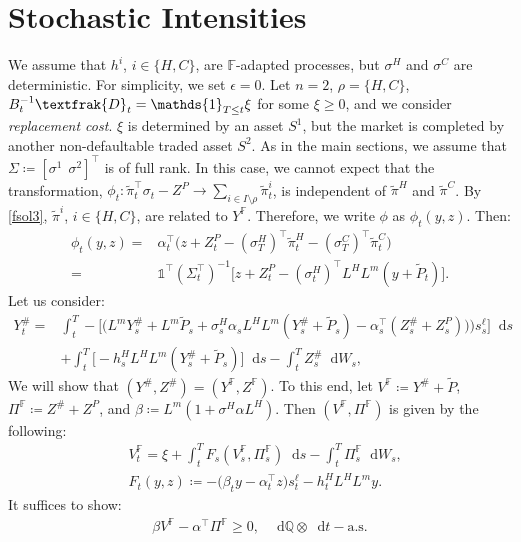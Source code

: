 \documentclass[a4paper, 11pt]{article}              %
\numberwithin{equation}{section}
\theoremstyle{plain}
\newcommand{\dqdt}{\df \dsQ \otimes \df t-\text{a.s}}
\newcommand{\1}{\mathds{1}}
\newcommand{\frD}{\textfrak{D}}
\newcommand{\pt}{\tilde{P}}
\newcommand{\pit}{\tilde{\pi}}
\newcommand{\dsF}{\mathbb{F}}
\newcommand{\dsQ}{\mathbb{Q}}
\theoremstyle{plain}
\theoremstyle{definition}
\theoremstyle{plain}
\newcommand*\df{\mathop{}\!\mathrm{d}}
\begin{document}
\section{Stochastic Intensities}
\label{app:sto.int}
We assume that $h^i$, $i \in \{H, C\}$, are $\dsF$-adapted processes, but
$\sigma^H$ and $\sigma^C$ are deterministic. For simplicity, we set
$\epsilon = 0$. Let $n=2$, $\rho =\{H, C\}$, $B_t^{-1}\frD_t = \1_{T \leq t}\xi$ for some
$\xi\geq0$, and we consider \textit{replacement cost}. $\xi$ is determined by an
asset $S^1$, but the market is completed by another non-defaultable traded asset
$S^2$. As in the main sections, we assume that
 $ \Sigma \coloneqq [\sigma^1 ~~\sigma^2]^\top $
is of full rank.  In this case, we cannot expect that the transformation,
 $\phi_t   \colon  \pit_t^\top\sigma_t-Z^P \to  \sum_{i \in I\setminus \rho} \pit^i_t$,
is independent of $\pit^H$ and $\pit^C$. By \cref{fsol3},
$\pit^i$, $i \in \{H, C\}$, are related to  $Y^\dsF$. Therefore, we write $\phi$ as
$  \phi_t(y, z)$. 
 Then:
\begin{align}
  \phi_t(y, z)
  =& \alpha_t^\top\big(z+Z^P_t-(\sigma^H_T)^\top\pit^H_t-(\sigma^C_T)^\top\pit^C_t\big)\nonumber \\
  =& \1^\top(\Sigma^\top_t)^{-1}\big[z+Z^P_t-(\sigma^H_t)^\top L^HL^m(y + \pt_t)\big].\nonumber
\end{align}
Let us consider:
\begin{align}
  Y^\#_t =& \int_{t}^{T} -\bigg[\Big(L^mY^\#_s +L^m\pt_s
            +\sigma^H_s\alpha_s L^HL^m(Y^\#_s+\pt_s)-\alpha_s^\top(Z^\#_s+Z^P_s))\Big)s^{\ell}_s
            \bigg]\df s\nonumber\\
  &+\int_{t}^{T}
    \big[-h^H_sL^HL^m(Y^\#_s+\pt_s)\big]\df s
    -\int_{t}^{T}Z^\#_s\df W_s,  \nonumber 
\end{align}
We will show that $(Y^\#, Z^\#) = (Y^\dsF, Z^\dsF)$. To this end, let $V^\dsF
\coloneqq Y^\#+\pt$, $\Pi^\dsF \coloneqq Z^\#+Z^P$, and $\beta \coloneqq
L^m(1+\sigma^H\alpha L^H)$. Then $(V^\dsF, \Pi^\dsF)$ is given by the following:
\begin{align} 
  &V^\dsF_t =\xi +\int_{t}^{T} F_s(V^\dsF_s, \Pi^\dsF_s)\df s
                 -\int_{t}^{T}\Pi^\dsF_s\df W_s,\label{appen:bsde}\\
  &F_t(y, z) \coloneqq-(\beta_t y - \alpha^\top_t z\big)s^\ell_t
                 - h^H_tL^HL^my.
\end{align}
It suffices to show:
\begin{align}
  \beta V^\dsF - \alpha^\top \Pi^\dsF \geq0, ~~~\dqdt. \label{appen:ineq}
\end{align}  
\end{document}
